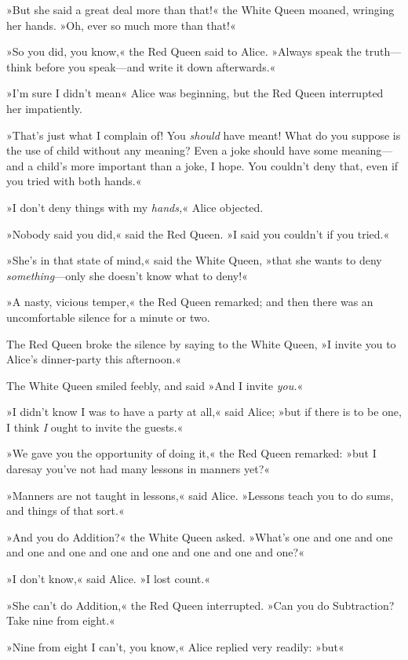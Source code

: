 »But she said a great deal more than that!« the White Queen moaned, wringing her hands. »Oh, ever so much more than that!«

»So you did, you know,« the Red Queen said to Alice. »Always speak the truth—think before you speak—and write it down afterwards.«

»I'm sure I didn't mean\longdash« Alice was beginning, but the Red Queen interrupted her impatiently.

»That's just what I complain of! You \textit{should} have meant! What do you suppose is the use of child without any meaning? Even a joke should have some meaning—and a child's more important than a joke, I hope. You couldn't deny that, even if you tried with both hands.«

»I don't deny things with my \textit{hands,}« Alice objected.

»Nobody said you did,« said the Red Queen. »I said you couldn't if you tried.«

»She's in that state of mind,« said the White Queen, »that she wants to deny \textit{something}—only she doesn't know what to deny!«

»A nasty, vicious temper,« the Red Queen remarked; and then there was an uncomfortable silence for a minute or two.

The Red Queen broke the silence by saying to the White Queen, »I invite you to Alice's dinner-party this afternoon.«

The White Queen smiled feebly, and said »And I invite \textit{you.}«

»I didn't know I was to have a party at all,« said Alice; »but if there is to be one, I think \textit{I} ought to invite the guests.«

»We gave you the opportunity of doing it,« the Red Queen remarked: »but I daresay you've not had many lessons in manners yet?«

»Manners are not taught in lessons,« said Alice. »Lessons teach you to do sums, and things of that sort.«

»And you do Addition?« the White Queen asked. »What's one and one and one and one and one and one and one and one and one and one?«

»I don't know,« said Alice. »I lost count.«

»She can't do Addition,« the Red Queen interrupted. »Can you do Subtraction? Take nine from eight.«

»Nine from eight I can't, you know,« Alice replied very readily: »but\longdash«

